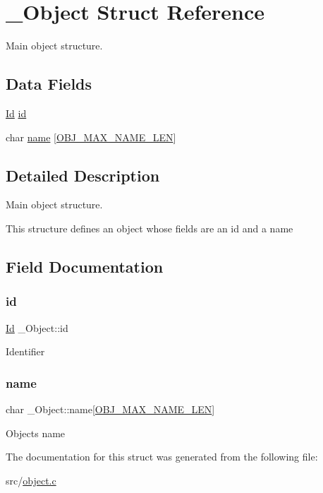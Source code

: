 \hypertarget{struct__Object}{}\section{\+\_\+\+Object Struct Reference}
\label{struct__Object}


Main object structure.  


\subsection*{Data Fields}
\begin{DoxyCompactItemize}
\item 
\hyperlink{types_8h_a845e604fb28f7e3d97549da3448149d3}{Id} \hyperlink{struct__Object_a3cff7a0e8dc4e9d23895ed9af1b7653a}{id}
\item 
char \hyperlink{struct__Object_a9cb87156f0fc0949a1fc8bc0e7ee2447}{name} \mbox{[}\hyperlink{object_8h_a0ab18f0c564533c5cf437c64e48cfb0f}{O\+B\+J\+\_\+\+M\+A\+X\+\_\+\+N\+A\+M\+E\+\_\+\+L\+EN}\mbox{]}
\end{DoxyCompactItemize}


\subsection{Detailed Description}
Main object structure. 

This structure defines an object whose fields are an id and a name 

\subsection{Field Documentation}
\mbox{\label{struct__Object_a3cff7a0e8dc4e9d23895ed9af1b7653a}} 
\subsubsection{\texorpdfstring{id}{id}}
{\footnotesize\ttfamily \hyperlink{types_8h_a845e604fb28f7e3d97549da3448149d3}{Id} \+\_\+\+Object\+::id}

Identifier \mbox{\label{struct__Object_a9cb87156f0fc0949a1fc8bc0e7ee2447}} 
\subsubsection{\texorpdfstring{name}{name}}
{\footnotesize\ttfamily char \+\_\+\+Object\+::name\mbox{[}\hyperlink{object_8h_a0ab18f0c564533c5cf437c64e48cfb0f}{O\+B\+J\+\_\+\+M\+A\+X\+\_\+\+N\+A\+M\+E\+\_\+\+L\+EN}\mbox{]}}

Object\textquotesingle{}s name 

The documentation for this struct was generated from the following file\+:\begin{DoxyCompactItemize}
\item 
src/\hyperlink{object_8c}{object.\+c}\end{DoxyCompactItemize}

